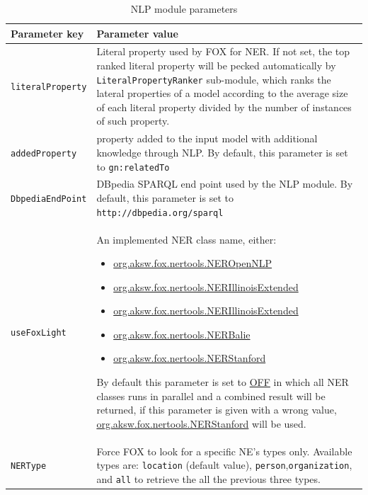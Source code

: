 \documentclass[a4paper,twoside,bibtotoc,abstracton,12pt,BCOR=15mm]{article}
\begin{document}
    \begin{table}
    \caption{NLP module parameters} \label{tbl:nlpPram}
    \small
    \begin{tabularx}{\textwidth}{@{}lX@{}}
    \toprule
    \textbf{Parameter key} 	& \textbf{Parameter value} \\
    \toprule
    \texttt{literalProperty}	& Literal property used by FOX for NER. If not set, the top ranked literal property will be pecked automatically by \texttt{LiteralPropertyRanker} sub-module, which ranks the  lateral properties of a model according to the average size of each literal property divided by the number of instances of such property.\\
    \midrule
    \texttt{addedProperty} & property added to the input model with additional knowledge through NLP. By default, this parameter is set to \texttt{gn:relatedTo\footnotemark[11]}\\
    \midrule
    \texttt{DbpediaEndPoint} & DBpedia SPARQL end point used by the NLP module. By default, this parameter is set to \texttt{http://dbpedia.org/sparql}\\
    \midrule
    \texttt{useFoxLight} 	& An implemented NER class name, either: 
			      \begin{itemize}
				  \itemsep-0.5em
				  \item \url{org.aksw.fox.nertools.NEROpenNLP}
				  \item \url{org.aksw.fox.nertools.NERIllinoisExtended}
				  \item \url{org.aksw.fox.nertools.NERIllinoisExtended}
				  \item \url{org.aksw.fox.nertools.NERBalie}
				  \item \url{org.aksw.fox.nertools.NERStanford}
			      \end{itemize}
			      By default this parameter is set to \url{OFF} in which all NER classes runs in parallel and a combined result will be returned, if this parameter is given with a wrong value, \url{org.aksw.fox.nertools.NERStanford} will be used. \\
    \midrule
    \texttt{NERType} 	& Force FOX to look for a specific NE's types only. Available types are: \texttt{location} (default value), \texttt{person},\texttt{organization}, and \texttt{all} to retrieve the all the previous three types.\\ 

\end{tabularx}
\end{table}
\end{document}

